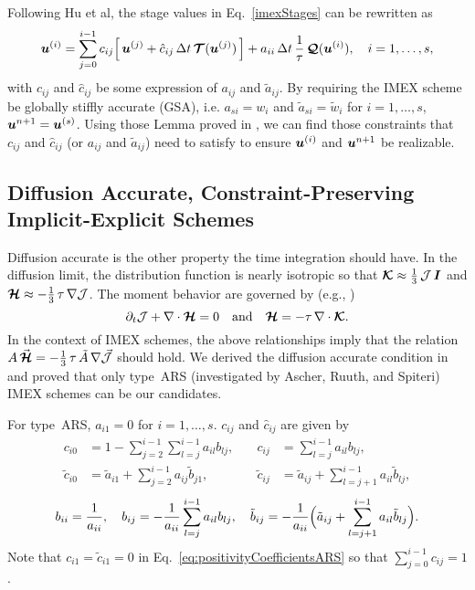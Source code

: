 Following Hu et al\cite{hu_etal_2018}, the stage values in Eq.~\eqref{imexStages} can be rewritten as
\begin{equation}
  \boldsymbol{u}^{(i)}
  =\sum_{j=0}^{i-1}c_{ij}\Big[\,\boldsymbol{u}^{(j)}+\hat{c}_{ij}\,\Delta t\,\boldsymbol{\mathcal{T}}(\boldsymbol{u}^{(j)})\,\Big]
  +a_{ii}\,\Delta t\,\frac{1}{\tau}\,\boldsymbol{\mathcal{Q}}(\boldsymbol{u}^{(i)}),\quad i=1,\ldots,s,
  \label{eq:imexStagesRewrite}
\end{equation}
with $c_{ij}$ and $\hat{c}_{ij}$ be some expression of $a_{ij}$ and $\tilde{a}_{ij}$.
By requiring the IMEX scheme be globally stiffly accurate (GSA), i.e. $a_{si}=w_{i}$ and $\tilde{a}_{si}=\tilde{w}_{i}$ for $i=1,\ldots,s$, $\boldsymbol{u}^{n+1} = \boldsymbol{u}^{(s)}$.
Using those Lemma proved in \cite{chu_etal_2018}, we can find those constraints that $c_{ij}$ and $\hat{c}_{ij}$ (or $a_{ij}$ and $\tilde{a}_{ij}$) need to satisfy to ensure $\boldsymbol{u}^{(i)}$ and $\boldsymbol{u}^{n+1}$ be realizable.

\subsection{Diffusion Accurate, Constraint-Preserving Implicit-Explicit Schemes}
Diffusion accurate is the other property the time integration should have.
In the diffusion limit, the distribution function is nearly isotropic so that $\boldsymbol{\mathcal{K}}\approx\frac{1}{3}\,\mathcal{J}\,\boldsymbol{I}$ and $\boldsymbol{\mathcal{H}}\approx-\frac{1}{3}\,\tau\,\nabla\mathcal{J}$.
The moment behavior are governed by (e.g., \cite{jinLevermore_1996})
\begin{equation}
  \partial_{t}{\mathcal{J}} + \nabla\cdot\boldsymbol{\mathcal{H}} = 0
  \quad\text{and}\quad
  \boldsymbol{\mathcal{H}} = - \tau\,\nabla\cdot\boldsymbol{\mathcal{K}}.  
  \label{eq:diffusionLimit}
\end{equation}
In the context of IMEX schemes, the above relationships imply that the relation $A\,\vec{\boldsymbol{\mathcal{H}}}=-\frac{1}{3}\,\tau\,\tilde{A}\,\nabla\vec{\mathcal{J}}$ should hold. 
We derived the diffusion accurate condition in \cite{chu_etal_2018} and proved that only type~ARS (investigated by Ascher, Ruuth, and Spiteri\cite{ascher_etal_1997}) IMEX schemes can be our candidates.

For type~ARS, $a_{i1} = 0$ for $i=1,\ldots,s$.
$c_{ij}$ and $\hat{c}_{ij}$ are given by
    \begin{equation}
     \begin{aligned}
      c_{i0} &= 1-\sum_{j=2}^{i-1}\sum_{l=j}^{i-1}a_{il}b_{lj}, \quad &
      c_{ij} &= \sum_{l=j}^{i-1}a_{il}b_{lj}, \\
      \tilde{c}_{i0} &= \tilde{a}_{i1}+\sum_{j=2}^{i-1}a_{ij}\tilde{b}_{j1}, \quad &
      \tilde{c}_{ij} &= \tilde{a}_{ij}+\sum_{l=j+1}^{i-1}a_{il}\tilde{b}_{lj},  
     \end{aligned}
     \label{eq:positivityCoefficientsARS}
    \end{equation}
    \begin{equation}
      b_{ii} = \frac{1}{a_{ii}}, \quad
      b_{ij} = -\frac{1}{a_{ii}}\sum_{l=j}^{i-1}a_{il}b_{lj}, \quad
      \tilde{b}_{ij} = -\frac{1}{a_{ii}}\Big(\tilde{a}_{ij}+\sum_{l=j+1}^{i-1}a_{il}\tilde{b}_{lj}\Big).  
    \end{equation}
    Note that $c_{i1}=\tilde{c}_{i1}=0$ in Eq.~\eqref{eq:positivityCoefficientsARS} so that $\sum_{j=0}^{i-1}c_{ij}=1$.
    
